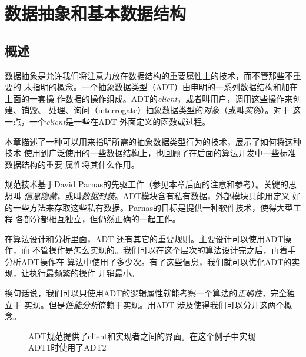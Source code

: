 \chapter{数据抽象和基本数据结构}

\section{概述}
数据抽象是允许我们将注意力放在数据结构的重要属性上的技术，而不管那些不重要的
未指明的概念。一个抽象数据类型（ADT）由申明的一系列数据结构和加在上面的一套操
作数据的操作组成。ADT的\emph{client}，或者叫用户，调用这些操作来创建、销毁、
处理、询问（interrogate）抽象数据类型的\emph{对象}（或叫\emph{实例}）。对于
这一点，一个\emph{client}是一些在ADT 外面定义的函数或过程。

本章描述了一种可以用来指明所需的抽象数据类型行为的技术，展示了如何将这种技术
使用到广泛使用的一些数据结构上，也回顾了在后面的算法开发中一些标准数据结构的重要
属性将其什么作用。

规范技术基于David Parnas的先驱工作（参见本章后面的注意和参考）。关键的思想叫
\emph{信息隐藏}，或叫\emph{数据封装}。ADT模块含有私有数据，外部模块只能用定义
好的一些方法来存取这些私有数据。Parnas的目标是提供一种软件技术，使得大型工程
各部分都相互独立，但仍然正确的一起工作。

在算法设计和分析里面，ADT 还有其它的重要规则。主要设计可以使用ADT操作，而
不管操作是怎么实现的。我们可以在这个层次的算法设计完之后，再着手分析ADT操作在
算法中使用了多少次。有了这些信息，我们就可以优化ADT的实现，让执行最频繁的操作
开销最小。

换句话说，我们可以只使用ADT的逻辑属性就能考察一个算法的\emph{正确性}，完全独立于
实现。但是\emph{性能分析}倚赖于实现。用ADT 涉及使得我们可以分开这两个概念。

\begin{figure*}[!t]
    \centering
    \caption{ADT规范提供了client和实现者之间的界面。在这个例子中实现ADT1时使用了ADT2}
    \label{Fig:ExampleOfADT}
\end{figure*}

